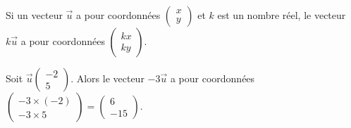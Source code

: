 \documentclass[
	classe=$2^{de}$
]{coursclass}
\begin{document}
\begin{propriete}
	Si un vecteur $\vec{u}$ a pour coordonnées $\begin{pmatrix} x \\ y \end{pmatrix}$ et $k$ est un nombre réel, le vecteur $k\vec{u}$ a pour coordonnées $\begin{pmatrix} kx \\ ky \end{pmatrix}$.
\end{propriete}

\begin{exemple}
	Soit $\vec{u}\begin{pmatrix} -2 \\ 5 \end{pmatrix}$. Alors le vecteur $-3\vec{u}$ a pour coordonnées $\begin{pmatrix} -3 × (-2) \\ -3 × 5 \end{pmatrix} = \begin{pmatrix} 6 \\ -15 \end{pmatrix}$.
\end{exemple}
\end{document}
